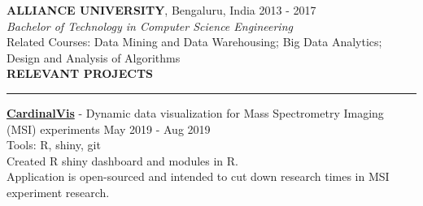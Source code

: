 \documentclass[a4paper]{article}
\newcommand{\myline}{\par
  \kern2pt %
  \hrule height 0.5pt
  \kern2pt %
}
\newcommand{\mybullet}{
	\indent 
  \textbullet \hspace*{2mm}
}
\begin{document}
 	\noindent
	\textbf{ALLIANCE UNIVERSITY}, Bengaluru, India \hfill 2013 - 2017 \\
	\textit{Bachelor of Technology in Computer Science Engineering} \\
  Related Courses: Data Mining and Data Warehousing; Big Data Analytics; Design and Analysis of Algorithms \\

	
	
\noindent
{\large \textbf{RELEVANT PROJECTS}}
\myline 
\smallskip

      \noindent
      \textbf{\href{https://github.com/kuwisdelu/CardinalVis/}{CardinalVis}} - 
      Dynamic data visualization for Mass Spectrometry Imaging (MSI) experiments 
      \hfill May 2019 - Aug 2019 \\
      Tools: R, shiny, git \\
      \mybullet Created R shiny dashboard and modules in R. \\
      \mybullet Application is open-sourced and intended to cut down research times in MSI experiment research. \\
\end{document}
